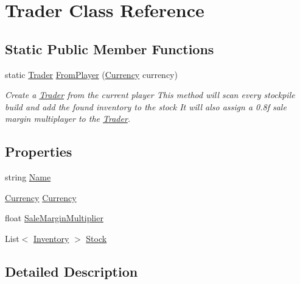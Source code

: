 \hypertarget{class_trader}{}\section{Trader Class Reference}
\label{class_trader}
\subsection*{Static Public Member Functions}
\begin{DoxyCompactItemize}
\item 
static \hyperlink{class_trader}{Trader} \hyperlink{class_trader_a20568768abb24b6706dea5bb8981fda7}{From\+Player} (\hyperlink{class_currency}{Currency} currency)
\begin{DoxyCompactList}\small\item\em Create a \hyperlink{class_trader}{Trader} from the current player This method will scan every stockpile build and add the found inventory to the stock It will also assign a 0.\+8f sale margin multiplayer to the \hyperlink{class_trader}{Trader}. \end{DoxyCompactList}\end{DoxyCompactItemize}
\subsection*{Properties}
\begin{DoxyCompactItemize}
\item 
string \hyperlink{class_trader_a2222005abbbaa8f451545be04ac073da}{Name}
\item 
\hyperlink{class_currency}{Currency} \hyperlink{class_trader_a9f4dec66f691ba5654ea352efa5af78b}{Currency}
\item 
float \hyperlink{class_trader_a21872d21fd0f4e201f62bc97d21501e1}{Sale\+Margin\+Multiplier}
\item 
List$<$ \hyperlink{class_inventory}{Inventory} $>$ \hyperlink{class_trader_a27280f5dd966850da20e9bc28ccb1c88}{Stock}
\end{DoxyCompactItemize}


\subsection{Detailed Description}


